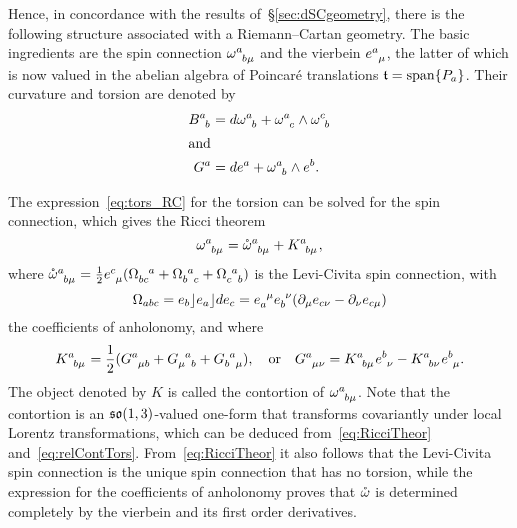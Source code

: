\documentclass[
final,
11pt,
a4paper,
DIV=11,
headinclude=true,
footinclude=false,
bibliography=totoc,
twoside=true,  %
BCOR=5mm
]{scrbook}
\begin{document}
Hence, in concordance with the results 
of~\S\ref{sec:dSCgeometry}, there is the following structure 
associated with a Riemann--Cartan geometry. The basic ingredients 
are the spin connection $\omega\ind{^a_{b\mu}}$ and the vierbein 
$e\ind{^a_\mu}$, the latter of which is now valued in the abelian 
algebra of Poincar\'e translations $\mathfrak{t} = \mathrm{span}\{P_a\}$.  
Their curvature and torsion are denoted by
\begin{subequations}
\label{eqs:curvtors_RC}
\begin{align}
\label{eq:curv_RC}
  B\ind{^a_b} &= d\omega\ind{^a_b} + \omega\ind{^a_c} \wedge 
  \omega\ind{^c_b}
  \\
  \shortintertext{and}
\label{eq:tors_RC}
  G^a &= de^a + \omega\ind{^a_b} \wedge e^b.
\end{align}
\end{subequations}

The expression~\eqref{eq:tors_RC} for the torsion can be solved 
for the spin connection, which gives the Ricci theorem
\begin{equation}
\label{eq:RicciTheor}
  \omega\ind{^a_{b\mu}} = \mring{\omega}\ind{^a_{b\mu}} 
  + K\ind{^a_{b\mu}},
\end{equation}
where $\mring{\omega}\ind{^a_{b\mu}} 
= \tfrac{1}{2}e\ind{^c_\mu}(\Omega\ind{_{bc}^a} 
+ \Omega\ind{_b^a_c} + \Omega\ind{_c^a_b})$ is the Levi-Civita 
spin connection, with
\begin{equation*}
  \Omega_{abc} = e_b \ip e_a \ip de_c = e\ind{_a^\mu} 
  e\ind{_b^\nu}(\pd_\mu e_{c\nu} - \pd_\nu e_{c\mu})
\end{equation*}
the coefficients of anholonomy, and where
\begin{equation}
\label{eq:relContTors}
  K\ind{^a_{b\mu}} = \frac{1}{2} (G\ind{^a_{\mu b}} 
  + G\ind{_\mu^a_b} + G\ind{_b^a_\mu}),
  \quad\text{or}\quad
  G\ind{^a_{\mu\nu}} = K\ind{^a_{b\mu}} e\ind{^b_\nu} 
  - K\ind{^a_{b\nu}} e\ind{^b_\mu}.
\end{equation}
The object denoted by $K$ is called the contortion of 
$\omega\ind{^a_{b\mu}}$.  Note that the contortion is an 
$\mathfrak{so}(1,3)$-valued one-form that transforms covariantly under 
local Lorentz transformations, which can be deduced 
from~\eqref{eq:RicciTheor} and~\eqref{eq:relContTors}.  
From~\eqref{eq:RicciTheor} it also follows that the Levi-Civita 
spin connection is the unique spin connection that has no 
torsion, while the expression for the coefficients of anholonomy 
proves that $\mathring{\omega}$ is determined completely by the 
vierbein and its first order derivatives.
\end{document}
